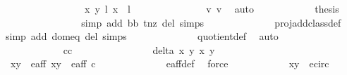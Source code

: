 \begin{isabellebody}
\ \ \ \ \ \ \ \ \ \ \ \ \ \ \ \ {\isacharbraceleft}{\isacharparenleft}{\isacharparenleft}{\isacharparenleft}x{\isacharcomma}\ y{\isacharparenright}{\isacharcomma}\ l{\isacharparenright}{\isacharcomma}\ {\isacharparenleft}x{\isacharprime}{\isacharcomma}\ {}{\isacharparenright}{\isacharcomma}\ l{\isacharprime}{\isacharparenright}{\isacharbraceright}{\isachardoublequoteclose}\ \isanewline
\ \ \ \ \ \ \ \ \ \ \ \ \isamarkupfalse%
\ v{}\ v{}\ \isamarkupfalse%
\ auto\isanewline
\ \ \ \ \ \ \ \ \ \ \isamarkupfalse%
\ {\isacharquery}thesis\ \isanewline
\ \ \ \ \ \ \ \ \ \ \ \ \isamarkupfalse%
\ {}\ \isamarkupfalse%
{\isacharparenleft}simp\ add{\isacharcolon}\ bb\ t{\isacharunderscore}nz\ del{\isacharcolon}\ {\isasymtau}{\isachardot}simps{\isacharparenright}\isanewline
\ \ \ \ \ \ \ \ \ \ \ \ \isamarkupfalse%
\ proj{\isacharunderscore}add{\isacharunderscore}class{\isacharunderscore}def\ \isamarkupfalse%
{\isacharparenleft}simp\ add{\isacharcolon}\ dom{\isacharunderscore}eq\ del{\isacharcolon}\ {\isasymtau}{\isachardot}simps{\isacharparenright}\isanewline
\ \ \ \ \ \ \ \ \ \ \ \ \isamarkupfalse%
\ quotient{\isacharunderscore}def\ \isamarkupfalse%
\ auto\isanewline
\ \ \ \ \ \ \ \ \isamarkupfalse%
\isanewline
\ \ \ \ \ \ \ \ \ \ \isamarkupfalse%
\ cc\ \ \ \ \isanewline
\ \ \ \ \ \ \ \ \ \ \isamarkupfalse%
\ {\isachardoublequoteopen}delta\ x\ y\ x{\isacharprime}\ y{\isacharprime}\ {\isacharequal}\ {}{\isachardoublequoteclose}\ \isanewline
\ \ \ \ \ \ \ \ \ \ \ \ \isamarkupfalse%
\ {\isacartoucheopen}{\isacharparenleft}x{\isacharcomma}y{\isacharparenright}\ {\isasymin}\ e{\isacharunderscore}aff{\isacartoucheclose}\ {\isacartoucheopen}{\isacharparenleft}x{\isacharprime}{\isacharcomma}y{\isacharprime}{\isacharparenright}\ {\isasymin}\ e{\isacharunderscore}aff{\isacartoucheclose}\ c\isanewline
\ \ \ \ \ \ \ \ \ \ \ \ \isamarkupfalse%
\ e{\isacharunderscore}aff{\isacharunderscore}{}{\isacharunderscore}def\ \isamarkupfalse%
\ force\isanewline
\ \ \ \ \ \ \ \ \ \ \isamarkupfalse%
\ {\isachardoublequoteopen}{\isacharparenleft}x{\isacharprime}{\isacharcomma}y{\isacharprime}{\isacharparenright}\ {\isasymin}\ e{\isacharunderscore}circ{\isachardoublequoteclose}\isanewline
\ \ \ \ \ \ \ \ \ \ \ \ \isamarkupfalse%

\end{isabellebody}
